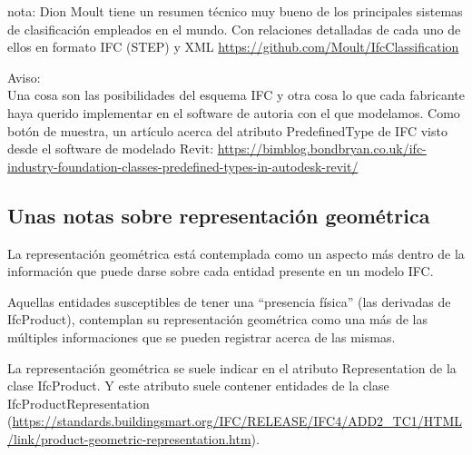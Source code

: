 \documentclass[spanish,10pt,a4paper,final,oneside]{article}
\begin{document}
nota: Dion Moult tiene un resumen técnico muy bueno de los principales sistemas de clasificación empleados en el mundo. Con relaciones detalladas de cada uno de ellos en formato IFC (STEP) y XML  \url{https://github.com/Moult/IfcClassification}


\vspace{1cm}
Aviso:
\\Una cosa son las posibilidades del esquema IFC y otra cosa lo que cada fabricante haya querido implementar en el software de autoria con el que modelamos. Como botón de muestra, un artículo acerca del atributo PredefinedType de IFC visto desde el software de modelado Revit: \url{https://bimblog.bondbryan.co.uk/ifc-industry-foundation-classes-predefined-types-in-autodesk-revit/}



\subsection{Unas notas sobre representación geométrica}
La representación geométrica está contemplada como un aspecto más dentro de la información que puede darse sobre cada entidad presente en un modelo IFC. 

Aquellas entidades susceptibles de tener una ``presencia física'' (las derivadas de IfcProduct), contemplan su representación geométrica como una más de las múltiples informaciones que se pueden registrar acerca de las mismas. 

La representación geométrica se suele indicar en el atributo Representation de la clase IfcProduct. Y este atributo suele contener entidades de la clase IfcProductRepresentation (\url{https://standards.buildingsmart.org/IFC/RELEASE/IFC4/ADD2_TC1/HTML/link/product-geometric-representation.htm}).
\end{document}
